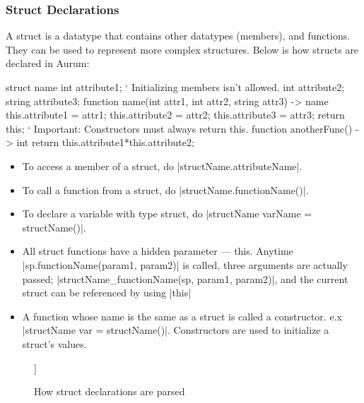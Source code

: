 \documentclass[12pt, letterpaper, oneside]{article}
\begin{document}
	\subsubsection{Struct Declarations}
	A struct is a datatype that contains other datatypes (members), and \newline functions. They can be used to represent more complex structures. Below is how structs are declared in Aurum:
	\begin{spverbatim}
		struct name {
			int attribute1; ` Initializing members isn't allowed.
			int attribute2;
			string attribute3;
			function name(int attr1, int attr2, string attr3) -> name {
				this.attribute1 = attr1;
				this.attribute2 = attr2;
				this.attribute3 = attr3;
				return this; ` Important: Constructors must always return this.
			}
			function anotherFunc() -> int {
				return this.attribute1*this.attribute2;
			}
		}
	\end{spverbatim}
	\begin{itemize}
		\item[--] To access a member of a struct, do \spverb|structName.attributeName|.
		\item[--] To call a function from a struct, do \spverb|structName.functionName()|.
		\item[--] To declare a variable with type struct, do \newline \spverb|structName varName = structName()|.
		\item[--] All struct functions have a hidden parameter --- this. Anytime \newline \spverb|sp.functionName(param1, param2)| is called, three arguments are \newline actually passed; \spverb|structName_functionName(sp, param1, param2)|, and the current struct can be referenced by using \spverb|this|
		\item[--] A function whose name is the same as a struct is called a \newline constructor. e.x \spverb|structName var = structName()|. Constructors are used to initialize a struct's values.
	\end{itemize}
	\begin{figure}[h]
		\begin{forest}
			[STRUCT DECLARATION
			[child0: declaration of attribute 1]
			[child2: declaration of constructor()]
			]
		\end{forest}
		\caption{How struct declarations are parsed}
	\end{figure}
	
\end{document}
